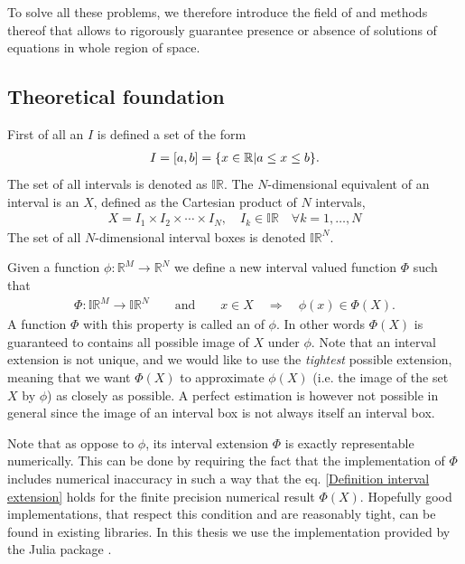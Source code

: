 \documentclass[
11pt, %
english, %
singlespacing, %
nolistspacing, %
liststotoc, %
headsepline, %
]{MastersDoctoralThesis} %
\begin{document}
To solve all these problems, we therefore introduce the field of  and methods thereof that allows to rigorously guarantee presence or absence of solutions of equations in whole region of space.

\subsection{Theoretical foundation}

First of all an  $I$ is defined a set of the form
\begin{align}
	I = \left[a, b\right] = \{x \in \mathbb{R} | a \leq x \leq b\}.
\end{align}
The set of all intervals is denoted as $\mathbb{IR}$. The $N$-dimensional equivalent of an interval is an  $X$, defined as the Cartesian product of $N$ intervals,
\begin{align}
	X = I_1 \times I_2 \times \cdots \times I_N, \quad I_k \in \mathbb{IR} \quad \forall k = 1, \dots, N
\end{align}
The set of all $N$-dimensional interval boxes is denoted $\mathbb{IR}^N$.

Given a function $\phi : \mathbb{R}^M \rightarrow \mathbb{R}^N$ we define a new interval valued function $\Phi$ such that
\begin{align}
	\Phi : \mathbb{IR}^M \rightarrow \mathbb{IR}^N \qquad \text{and} \qquad x \in X \quad \Rightarrow \quad \phi(x) \in \Phi(X). \label{Definition interval extension}
\end{align}
A function $\Phi$ with this property is called an  of $\phi$. In other words $\Phi(X)$ is guaranteed to contains all possible image of $X$ under $\phi$. Note that an interval extension is not unique, and we would like to use the \emph{tightest} possible extension, meaning that we want $\Phi(X)$ to approximate $\phi(X)$ (i.e. the image of the set $X$ by $\phi$) as closely as possible. A perfect estimation is however not possible in general since the image of an interval box is not always itself an interval box.

Note that as oppose to $\phi$, its interval extension $\Phi$ is exactly representable numerically. This can be done by requiring the fact that the implementation of $\Phi$ includes numerical inaccuracy in such a way that the eq. \eqref{Definition interval extension} holds for the finite precision numerical result $\Phi(X)$. Hopefully good implementations, that respect this condition and are reasonably tight, can be found in existing libraries. In this thesis we use the implementation provided by the Julia package \missingref{}.
\end{document}
